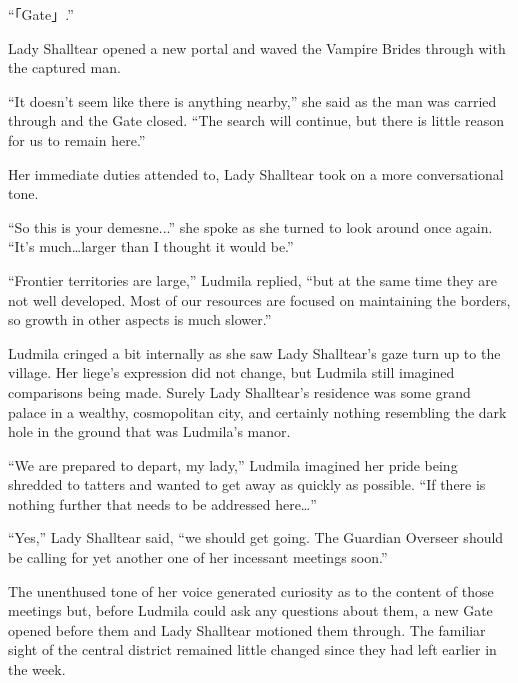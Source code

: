  

“「Gate」.”

 

Lady Shalltear opened a new portal and waved the Vampire Brides through with the captured man.

 

“It doesn’t seem like there is anything nearby,” she said as the man was carried through and the Gate closed. “The search will continue, but there is little reason for us to remain here.”

 

Her immediate duties attended to, Lady Shalltear took on a more conversational tone.

 

“So this is your demesne...” she spoke as she turned to look around once again. “It’s much…larger than I thought it would be.”

 

“Frontier territories are large,” Ludmila replied, “but at the same time they are not well developed. Most of our resources are focused on maintaining the borders, so growth in other aspects is much slower.”

 

Ludmila cringed a bit internally as she saw Lady Shalltear’s gaze turn up to the village. Her liege’s expression did not change, but Ludmila still imagined comparisons being made. Surely Lady Shalltear’s residence was some grand palace in a wealthy, cosmopolitan city, and certainly nothing resembling the dark hole in the ground that was Ludmila’s manor.

 

“We are prepared to depart, my lady,” Ludmila imagined her pride being shredded to tatters and wanted to get away as quickly as possible. “If there is nothing further that needs to be addressed here…”

 

“Yes,” Lady Shalltear said, “we should get going. The Guardian Overseer should be calling for yet another one of her incessant meetings soon.”

 

The unenthused tone of her voice generated curiosity as to the content of those meetings but, before Ludmila could ask any questions about them, a new Gate opened before them and Lady Shalltear motioned them through. The familiar sight of the central district remained little changed since they had left earlier in the week.

 

